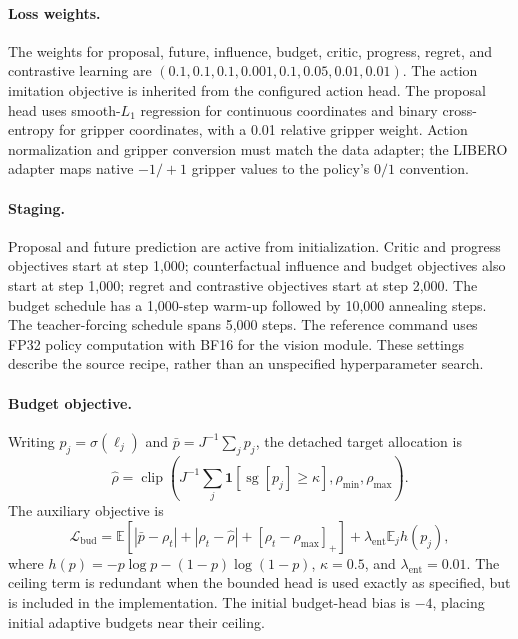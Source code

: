 \documentclass{article}
\newcommand{\sg}{\operatorname{sg}}
\newcommand{\E}{\mathbb{E}}
\begin{document}
\paragraph{Loss weights.}
The weights for proposal, future, influence, budget, critic, progress, regret, and contrastive learning are $(0.1,0.1,0.1,0.001,0.1,0.05,0.01,0.01)$. The action imitation objective is inherited from the configured action head. The proposal head uses smooth-$L_1$ regression for continuous coordinates and binary cross-entropy for gripper coordinates, with a 0.01 relative gripper weight. Action normalization and gripper conversion must match the data adapter; the LIBERO adapter maps native $-1/+1$ gripper values to the policy's $0/1$ convention.

\paragraph{Staging.}
Proposal and future prediction are active from initialization. Critic and progress objectives start at step 1,000; counterfactual influence and budget objectives also start at step 1,000; regret and contrastive objectives start at step 2,000. The budget schedule has a 1,000-step warm-up followed by 10,000 annealing steps. The teacher-forcing schedule spans 5,000 steps. The reference command uses FP32 policy computation with BF16 for the vision module. These settings describe the source recipe, rather than an unspecified hyperparameter search.

\paragraph{Budget objective.}
Writing $p_j=\sigma(\ell_j)$ and $\bar p=J^{-1}\sum_jp_j$, the detached target allocation is
\begin{equation}
\widehat\rho=\operatorname{clip}\!\left(
J^{-1}\sum_j\mathbf{1}[\sg[p_j]\geq\kappa],\rho_{\min},\rho_{\max}\right).
\end{equation}
The auxiliary objective is
\begin{equation}
\mathcal L_{\mathrm{bud}}=
\E\left[|\bar p-\rho_t|+|\rho_t-\widehat\rho|
+[\rho_t-\rho_{\max}]_+\right]
+\lambda_{\mathrm{ent}}\E_j h(p_j),
\end{equation}
where $h(p)=-p\log p-(1-p)\log(1-p)$, $\kappa=0.5$, and $\lambda_{\mathrm{ent}}=0.01$. The ceiling term is redundant when the bounded head is used exactly as specified, but is included in the implementation. The initial budget-head bias is $-4$, placing initial adaptive budgets near their ceiling.
\end{document}
